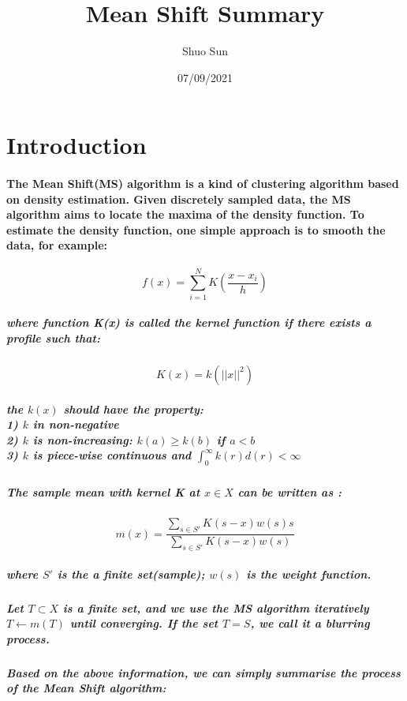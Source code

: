 \documentclass{article}
\title{Mean Shift Summary}
\author{Shuo Sun}
\date{07/09/2021}
\begin{document}
\maketitle

\section{Introduction}
\paragraph{
The Mean Shift(MS) algorithm is a kind of clustering algorithm based on density estimation. Given discretely sampled data, the MS algorithm aims to locate the maxima of the density function. To estimate the density function, one simple approach is to smooth the data, for example:
}
\begin{equation}
f(x) = \sum_{i=1}^{N}K(\frac{x-x_i}{h})
\end{equation}
\subparagraph{
where function K(x) is called the \textit{kernel function} if there exists a profile such that:
}
\begin{equation}
K(x) = k(||x||^2)
\end{equation}

\subparagraph{
the $k(x)$ should have the property:\\
1) $k$ in non-negative\\
2) $k$ is non-increasing: $k(a) \geq k(b)$ if $a < b$\\
3) $k$ is piece-wise continuous and $\int_{0}^{\infty}k(r)d(r) < \infty $
}

\subparagraph{
The sample mean with kernel K at $x \in X$ can be written as :
}

\begin{equation}
m(x) = \frac{\sum_{s\in S'}K(s-x)w(s)s}{\sum_{s \in S'}K(s-x)w(s)}
\end{equation}

\subparagraph{
where $S'$ is the a finite set(sample); $w(s)$ is the weight function.
}

\subparagraph{
Let $T \subset  X$ is a finite set, and we use the MS algorithm iteratively  $T \leftarrow m(T)$ until converging.  If the set $T = S$, we call it a blurring process.
}
\subparagraph{
Based on the above information, we can simply summarise the process of the Mean Shift algorithm:
}
\end{document}
